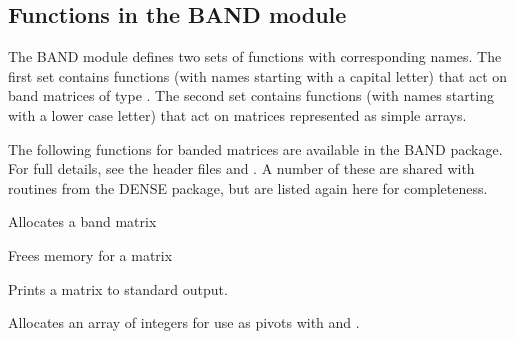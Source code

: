 \documentclass[letterpaper,10pt,english]{sphinxmanual}
\begin{document}
\subsection{Functions in the BAND module}
\label{linear_solvers/DLS:functions-in-the-band-module}
The BAND module defines two sets of functions with corresponding
names. The first set contains functions (with names starting with a
capital letter) that act on band matrices of type {\hyperref[linear_solvers/DLS:DlsMat]{}}. The
second set contains functions (with names starting with a lower case
letter) that act on matrices represented as simple arrays.

The following functions for {\hyperref[linear_solvers/DLS:DlsMat]{}} banded matrices are
available in the BAND package. For full details, see the header files
 and .  A number of these are
shared with routines from the DENSE package, but are listed again here
for completeness.

\begin{fulllineitems}
\label{linear_solvers/DLS:NewBandMat}
Allocates a {\hyperref[linear_solvers/DLS:DlsMat]{}} band matrix

\end{fulllineitems}


\begin{fulllineitems}
Frees memory for a {\hyperref[linear_solvers/DLS:DlsMat]{}} matrix

\end{fulllineitems}


\begin{fulllineitems}
Prints a {\hyperref[linear_solvers/DLS:DlsMat]{}} matrix to standard output.

\end{fulllineitems}


\begin{fulllineitems}
Allocates an array of  integers for use as pivots with
 and .

\end{fulllineitems}
\end{document}

